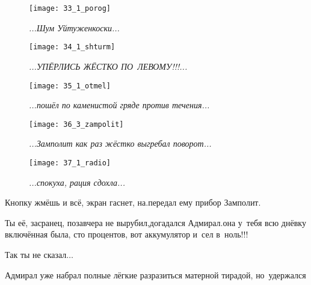 \begin{figure}[h]
	\centering
	\texttt{[image: 33\_1\_porog]}
	\caption{\small\textit{...Шум Уйтуженкоски...}}
\end{figure}

\newpage

\begin{figure}[h]
	\centering
	\texttt{[image: 34\_1\_shturm]}
	\caption{\small\textit{...УПЁРЛИСЬ ЖЁСТКО ПО~ЛЕВОМУ!!!...}}
\end{figure}

\newpage

\begin{figure}[h]
	\centering	
	\texttt{[image: 35\_1\_otmel]}
	\caption{\small\textit{...пошёл по каменистой гряде против течения...}}
\end{figure}

\newpage

\begin{figure}[h]
	\centering
	\texttt{[image: 36\_3\_zampolit]}
	\caption{\small\textit{...Замполит как раз жёстко выгребал поворот...}}
\end{figure}

\newpage

\begin{wrapfigure}[12]{r}{0.48\textwidth}
	\centering
	\texttt{[image: 37\_1\_radio]}
	\caption{\small\textit{...спокуха, рация сдохла...}}
\end{wrapfigure}

\diagdash Кнопку жмёшь и всё, экран гаснет, на.\mdash передал ему прибор Замполит.

\diagdash Ты её, засранец, позавчера не вырубил,\mdash догадался Адмирал.\mdash она у~тебя всю днёвку включённая была, сто процентов, вот аккумулятор и~сел в~ноль!!!

\diagdash Так ты не сказал$\ldots$

Адмирал уже набрал полные лёгкие разразиться матерной тирадой, но~удержался%

\newpage

